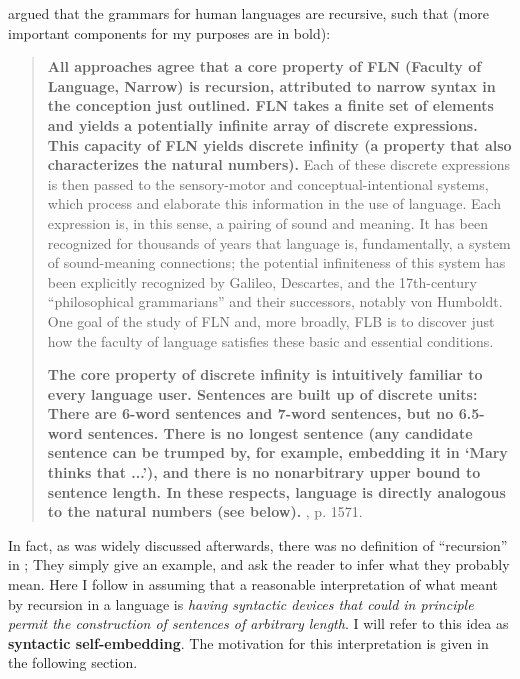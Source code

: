 \documentclass{article}
\begin{document}
\cite{hauser2002faculty} argued that the grammars for human languages are recursive, such that (more important components for my purposes are in bold):

\begin{quote}
\textbf{All approaches agree that a core property of FLN (Faculty of Language, Narrow) is recursion, attributed to narrow syntax in the conception just outlined. FLN takes a finite set of elements and yields a potentially infinite array of discrete expressions. This capacity of FLN yields discrete infinity (a property that also characterizes the natural numbers).} Each of these discrete expressions is then passed to the sensory-motor and conceptual-intentional systems, which process and elaborate this information in the use of language. Each expression is, in this sense, a pairing of sound and meaning. It has been recognized for thousands of years that language is, fundamentally, a system of sound-meaning connections; the potential infiniteness of this system has been explicitly recognized by Galileo, Descartes, and the 17th-century ``philosophical grammarians'' and their successors, notably von Humboldt. One goal of the study of FLN and, more broadly, FLB is to discover just how the faculty of language satisfies these basic and essential conditions.

\textbf{The core property of discrete infinity is intuitively familiar to every language user. Sentences are built up of discrete units:  There are 6-word sentences and 7-word sentences, but no 6.5-word sentences.  There is no longest sentence (any candidate sentence can be trumped by, for example, embedding it in `Mary thinks that ...'), and there is no nonarbitrary upper bound to sentence length.  In these respects, language is directly analogous to the natural numbers (see below). } \cite{hauser2002faculty}, p. 1571.
\end{quote}

In fact, as was widely discussed afterwards, there was no definition of ``recursion'' in \cite{hauser2002faculty};  They simply give an example, and ask the reader to infer what they probably mean.  
Here I follow \cite{pullum2020theorizing}  in assuming that a reasonable interpretation of what  \cite{hauser2002faculty} meant by recursion in a language is \textit{having syntactic devices that could in principle permit the construction of sentences of arbitrary length}.  I will refer to  this idea as \textbf{syntactic self-embedding}.  The motivation for this interpretation is given in the following section.
\end{document}
